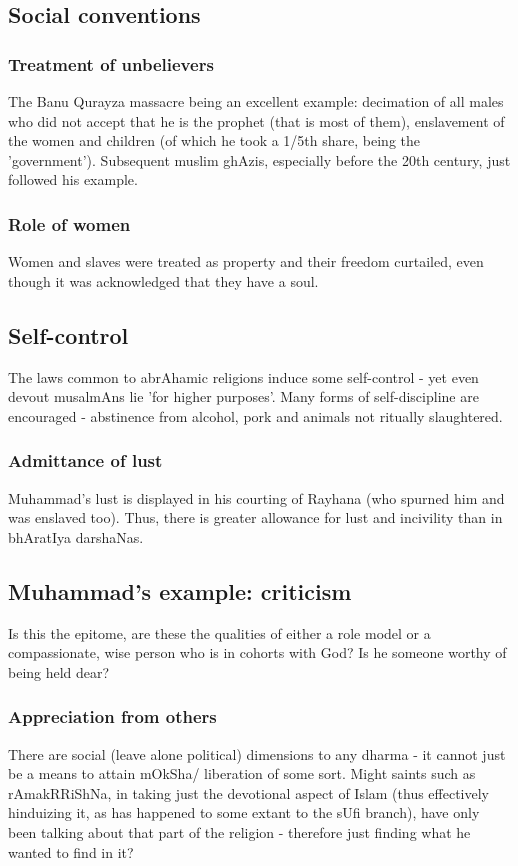 \documentclass[oneside, article]{memoir}
\begin{document}
\subsection{Social conventions}
\subsubsection{Treatment of unbelievers}
The Banu Qurayza massacre being an excellent example: decimation of all males who did not accept that he is the prophet (that is most of them), enslavement of the women and children (of which he took a 1/5th share, being the 'government'). Subsequent muslim ghAzis, especially before the 20th century, just followed his example.

\subsubsection{Role of women}
Women and slaves were treated as property and their freedom curtailed, even though it was acknowledged that they have a soul. \tbc


\subsection{Self-control}
The laws common to abrAhamic religions induce some self-control - yet even devout musalmAns lie 'for higher purposes'. Many forms of self-discipline are encouraged - abstinence from alcohol, pork and animals not ritually slaughtered.

\subsubsection{Admittance of lust}
Muhammad's lust is displayed in his courting of Rayhana (who spurned him and was enslaved too). Thus, there is greater allowance for lust and incivility than in bhAratIya darshaNas.

\subsection{Muhammad's example: criticism}
Is this the epitome, are these the qualities of either a role model or a compassionate, wise person who is in cohorts with God? Is he someone worthy of being held dear? 

\subsubsection{Appreciation from others}
There are social (leave alone political) dimensions to any dharma - it cannot just be a means to attain mOkSha/ liberation of some sort. Might saints such as rAmakRRiShNa, in taking just the devotional aspect of Islam (thus effectively hinduizing it, as has happened to some extant to the sUfi branch), have only been talking about that part of the religion - therefore just finding what he wanted to find in it?
\end{document}
